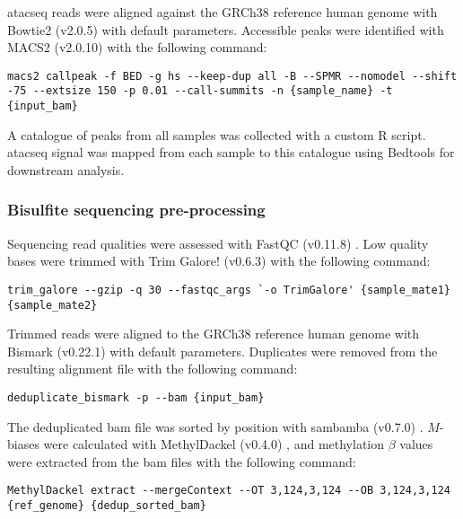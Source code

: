 \Gls{atacseq} reads were aligned against the GRCh38 reference human genome with Bowtie2 (v2.0.5) \cite{langmeadFastGappedreadAlignment2012} with default parameters.
Accessible peaks were identified with MACS2 (v2.0.10) \cite{zhangModelbasedAnalysisChIPSeq2008} with the following command:

\begin{lstlisting}[basicstyle=\ttfamily]
  macs2 callpeak -f BED -g hs --keep-dup all -B --SPMR --nomodel --shift -75 --extsize 150 -p 0.01 --call-summits -n {sample_name} -t {input_bam}
\end{lstlisting}

A catalogue of peaks from all samples was collected with a custom R script.
\Gls{atacseq} signal was mapped from each sample to this catalogue using Bedtools \cite{quinlanBEDToolsSwissArmyTool2014} for downstream analysis.

\subsubsection{Bisulfite sequencing pre-processing}

Sequencing read qualities were assessed with FastQC (v0.11.8) \cite{andrewsFastQCQualityControl2010}.
Low quality bases were trimmed with Trim Galore! (v0.6.3) \cite{kruegerTrimGalore2012} with the following command:

\begin{lstlisting}[basicstyle=\ttfamily]
  trim_galore --gzip -q 30 --fastqc_args `-o TrimGalore' {sample_mate1} {sample_mate2}
\end{lstlisting}

Trimmed reads were aligned to the GRCh38 reference human genome with Bismark (v0.22.1) \cite{kruegerDNAMethylomeAnalysis2012} with default parameters.
Duplicates were removed from the resulting alignment file with the following command:

\begin{lstlisting}[basicstyle=\ttfamily]
  deduplicate_bismark -p --bam {input_bam}
\end{lstlisting}

The deduplicated \gls{bam} file was sorted by position with sambamba (v0.7.0) \cite{tarasovSambambaFastProcessing2015}.
$M$-biases were calculated with MethylDackel (v0.4.0) \cite{ryanMethylDackel2019}, and methylation $\beta$ values were extracted from the \gls{bam} files with the following command:

\begin{lstlisting}[basicstyle=\ttfamily]
  MethylDackel extract --mergeContext --OT 3,124,3,124 --OB 3,124,3,124 {ref_genome} {dedup_sorted_bam}
\end{lstlisting}

